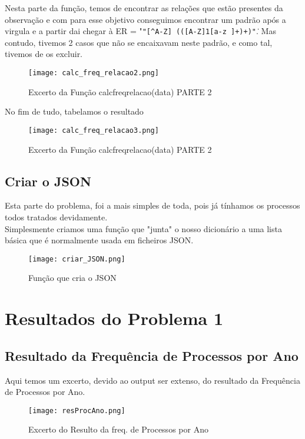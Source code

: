 \documentclass[11pt,a4paper]{report}%
\begin{document}
Nesta parte da função, temos de encontrar as relações que estão presentes da observação e com para esse objetivo conseguimos encontrar um padrão após a virgula e a partir dai chegar à ER = "\texttt{"[\textasciicircum A-Z]\,(([A-Z]{1}[a-z ]+)+)\."}.
Mas contudo, tivemos 2 casos que não se encaixavam neste padrão, e como tal, tivemos de os excluir.
\begin{figure}[htbp]
\centerline{\texttt{[image: calc\_freq\_relacao2.png]}}
\caption{Excerto da Função calc\textunderscore freq\textunderscore relacao(data) PARTE 2}
\label{fig}
\end{figure}

No fim de tudo, tabelamos o resultado
\begin{figure}[htbp]
\centerline{\texttt{[image: calc\_freq\_relacao3.png]}}
\caption{Excerto da Função calc\textunderscore freq\textunderscore relacao(data) PARTE 2}
\label{fig}
\end{figure}


\subsection{Criar o JSON} \label{subsec:jsondump}
Esta parte do problema, foi a mais simples de toda, pois já tínhamos os processos todos tratados devidamente.\\
Simplesmente criamos uma função que "junta" o nosso dicionário a uma lista básica que  é normalmente usada em ficheiros JSON.

\begin{figure}[htbp]
\centerline{\texttt{[image: criar\_JSON.png]}}
\caption{Função que cria o JSON}
\label{fig}
\end{figure}

\newpage
\section{Resultados do Problema 1} \label{sec:resProb1}
\subsection{Resultado da Frequência de Processos por Ano} \label{subsec:resProcAno}

Aqui temos um excerto, devido ao output ser extenso, do resultado da Frequência de Processos por Ano.

\begin{figure}[htbp]
\centerline{\texttt{[image: resProcAno.png]}}
\caption{Excerto do Resulto da freq. de Processos por Ano}
\label{fig}
\end{figure}
\end{document}
